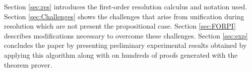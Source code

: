 \documentclass{llncs}
\begin{document}
Section \ref{sec:res} introduces the first-order resolution calculus and notation used. Section \ref{sec:Challenges} shows the challenges that arise from unification during resolution which are not present the propositional case. Section \ref{sec:FORPI} describes modifications necessary to overcome these challenges. Section \ref{sec:exp} concludes the paper by presenting preliminary experimental results obtained by applying this algorithm along with {\GFOLU} on hundreds of proofs generated with the {\SPASS} theorem prover. 







%

%
%








\begin{footnotesize}
%


\end{footnotesize}
\end{document}
